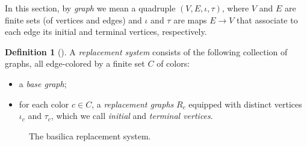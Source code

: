 \documentclass[JEP,XML,SOM,Unicode,NoFloatCountersInSection,published]{cedram}
\theoremstyle{plain}
\theoremstyle{definition}
\newtheorem{definition}[theorem]{Definition}
\theoremstyle{remark}
\begin{document}
In this section, by \emph{graph} we mean a quadruple $(V,E,\iota,\tau)$, where $V$ and $E$ are finite sets (of vertices and edges) and $\iota$ and $\tau$ are maps $E \to V$ that associate to each edge its initial and terminal vertices, respectively.

\begin{definition}[{\cite[Def.\,1.4]{Belk-Forrest}}]
A \emph{replacement system} consists of the following collection of graphs, all edge-colored by a finite set $C$ of colors:
\begin{itemize}
\item a \emph{base graph};
\item for each color $c \in C$, a \emph{replacement graphs} $R_c$ equipped with distinct vertices $\iota_c$ and $\tau_c$, which we call \emph{initial} and \emph{terminal vertices}.
\end{itemize}
\end{definition}

\begin{figure}[hb]
\centering
{}
\caption{The basilica replacement system.}
\label{fig.basilica.replacement.system}
\end{figure}
\end{document}
